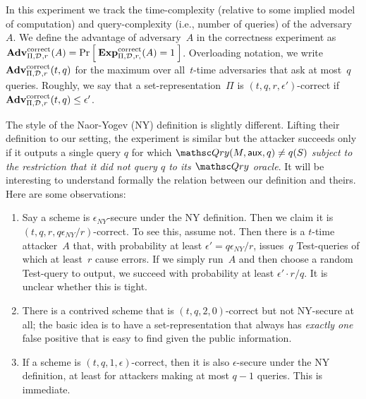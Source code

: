 In this experiment we track the time-complexity (relative to some
implied model of computation) and query-complexity (i.e., number of
queries) of the adversary~$A$.
We define the advantage of adversary~$A$ in the correctness experiment as
$\mathrm{\mathbf{Adv}}^{\mathrm{correct}}_{\Pi,\mathcal{D}_{}^{},r}(A) = \Pr\left[\: \mathrm{\mathbf{Exp}}^{\mathrm{correct}}_{\Pi,\mathcal{D}_{}^{}, r,}(A)=1 \:\right]$.
Overloading notation, we write $\mathrm{\mathbf{Adv}}^{\mathrm{correct}}_{\Pi,\mathcal{D}_{}^{},r}(t,q)$ for the maximum over all~$t$-time adversaries that ask at most~$q$ queries. Roughly, we say that a
set-representation~$\Pi$ is $(t,q,r,\epsilon')$-correct if $\mathrm{\mathbf{Adv}}^{\mathrm{correct}}_{\Pi,\mathcal{D}_{}^{},r}(t,q) \leq \epsilon'$.

The style of the Naor-Yogev (NY) definition is slightly different. 
Lifting their definition to our setting, the experiment is similar but the attacker
succeeds only if it outputs a single query $q$ for which $\Qry( M,
\aux, q) \neq q(S)$  \emph{subject to the restriction that it did not query $q$ to its $\Qry$ oracle}.
It will be interesting to understand formally the relation between our definition and theirs.
Here are some observations:
\begin{enumerate}
\item Say a scheme is $\epsilon_{NY}$-secure under the NY definition.
Then we claim it is $(t,q, r, q\epsilon_{NY}/r)$-correct. To see
this, assume not. Then there is a $t$-time attacker~$A$ that, with
probability at least $\epsilon'=q\epsilon_{NY}/r$,
issues~$q$ Test-queries of which at least~$r$ cause errors. If we simply run~$A$ and then choose a random Test-query to
output, we succeed with probability at least $\epsilon' \cdot r/q$. It is unclear whether this is tight.

\item There is a contrived scheme that is $(t, q, 2, 0)$-correct but not NY-secure at all; the basic idea is
to have a set-representation that always has \emph{exactly one} false positive that is easy to find
given the public information.

\item If a scheme is $(t,q,1,\epsilon)$-correct, then it is also $\epsilon$-secure under the NY definition,
at least for attackers making at most $q-1$ queries.
This is immediate.
\end{enumerate}

